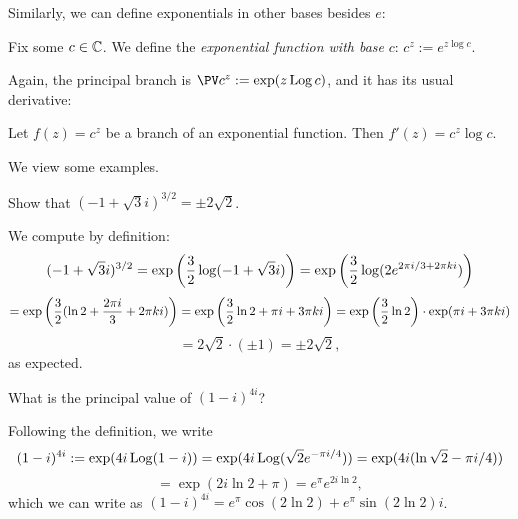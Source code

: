 \documentclass{article}
\begin{document}
Similarly, we can define exponentials in other bases besides $e$:
\begin{definition}
Fix some $c\in\mathbb C$. We define the \textit{exponential function with base} $c$: $c^z := e^{z\log c}$.
\end{definition}
Again, the principal branch is $\PV c^z := \exp(z\Log c)$, and it has its usual derivative:
\begin{proposition}
Let $f(z) = c^z$ be a branch of an exponential function. Then $f'(z) = c^z \log c$.
\end{proposition}

We view some examples. \newpage
\begin{example}
Show that $(-1+\sqrt 3i)^{3/2} = \pm 2\sqrt 2$.
\end{example}
\begin{solution}
We compute by definition:
$$(-1+\sqrt 3i)^{3/2} = \exp\left(\frac 32\log(-1+\sqrt 3i) \right) = \exp\left(\frac 32\log(2e^{2\pi i/3 + 2\pi ki}) \right)$$
$$=\exp\left(\frac 32(\ln 2 + \frac{2\pi i}3 + 2\pi ki) \right) = \exp\left( \frac 32\ln 2 + \pi i + 3\pi ki \right) = \exp\left(\frac 32\ln 2 \right)\cdot \exp(\pi i + 3\pi ki)$$
$$=2\sqrt 2\cdot (\pm 1)=\pm2\sqrt 2,$$
as expected.
\end{solution}
\begin{example}
What is the principal value of $(1-i)^{4i}$?
\end{example}
\begin{solution}
Following the definition, we write
$$(1-i)^{4i} := \exp(4i\operatorname{Log}(1-i)) = \exp(4i\operatorname{Log}(\sqrt 2e^{-\pi i/4})) = \exp(4i(\ln\sqrt 2 - \pi i/4))$$
$$=\exp(2i\ln 2 + \pi) = e^{\pi}e^{2i\ln 2},$$
which we can write as $(1-i)^{4i} = \boxed{e^\pi \cos(2\ln 2) + e^\pi\sin (2\ln 2)i}$.
\end{solution}

\setcounter{section}{49}
\end{document}
